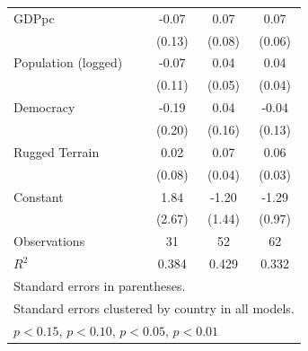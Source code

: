 \documentclass[12pt, letterpaper]{article}
\begin{document}
\begin{table}[htbp]
\begin{small}
\begin{tabular}{l*{3}{c}}
GDPpc               &       -0.07         &        0.07         &        0.07         \\
                    &      (0.13)         &      (0.08)         &      (0.06)         \\
Population (logged) &       -0.07         &        0.04         &        0.04         \\
                    &      (0.11)         &      (0.05)         &      (0.04)         \\
Democracy           &       -0.19         &        0.04         &       -0.04         \\
                    &      (0.20)         &      (0.16)         &      (0.13)         \\
Rugged Terrain      &        0.02         &        0.07\sym{+}  &        0.06\sym{*}  \\
                    &      (0.08)         &      (0.04)         &      (0.03)         \\
Constant            &        1.84         &       -1.20         &       -1.29         \\
                    &      (2.67)         &      (1.44)         &      (0.97)         \\
\hline
Observations        &          31         &          52         &          62         \\
\(R^{2}\)           &       0.384         &       0.429         &       0.332         \\
\hline\hline
\multicolumn{4}{l}{\footnotesize Standard errors in parentheses.}\\
\multicolumn{4}{l}{\footnotesize Standard errors clustered by country in all models.}\\
\multicolumn{4}{l}{\footnotesize \sym{+} \(p<0.15\), \sym{*} \(p<0.10\), \sym{**} \(p<0.05\), \sym{***} \(p<0.01\)}\\
\end{tabular}
\end{small}
\end{table}
\end{document}
